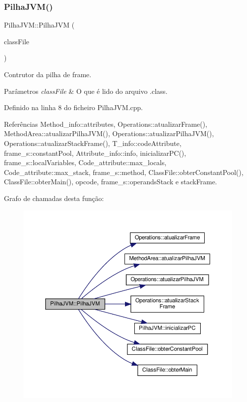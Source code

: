 \subsubsection{\texorpdfstring{Pilha\+J\+V\+M()}{PilhaJVM()}}
{\footnotesize\ttfamily Pilha\+J\+V\+M\+::\+Pilha\+J\+VM (\begin{DoxyParamCaption}\item[{\hyperlink{classClassFile}{Class\+File} $\ast$}]{class\+File }\end{DoxyParamCaption})}



Contrutor da pilha de frame. 


\begin{DoxyParams}{Parâmetros}
{\em class\+File} & O que é lido do arquivo .class. \\
\hline
\end{DoxyParams}


Definido na linha 8 do ficheiro Pilha\+J\+V\+M.\+cpp.



Referências Method\+\_\+info\+::attributes, Operations\+::atualizar\+Frame(), Method\+Area\+::atualizar\+Pilha\+J\+V\+M(), Operations\+::atualizar\+Pilha\+J\+V\+M(), Operations\+::atualizar\+Stack\+Frame(), T\+\_\+info\+::code\+Attribute, frame\+\_\+s\+::constant\+Pool, Attribute\+\_\+info\+::info, inicializar\+P\+C(), frame\+\_\+s\+::local\+Variables, Code\+\_\+attribute\+::max\+\_\+locals, Code\+\_\+attribute\+::max\+\_\+stack, frame\+\_\+s\+::method, Class\+File\+::obter\+Constant\+Pool(), Class\+File\+::obter\+Main(), opcode, frame\+\_\+s\+::operands\+Stack e stack\+Frame.

Grafo de chamadas desta função\+:
\nopagebreak
\begin{figure}[H]
\begin{center}
\leavevmode
\includegraphics[width=350pt]{classPilhaJVM_a9acc6081073376a6f658c9dcfd3f6011_cgraph}
\end{center}
\end{figure}


